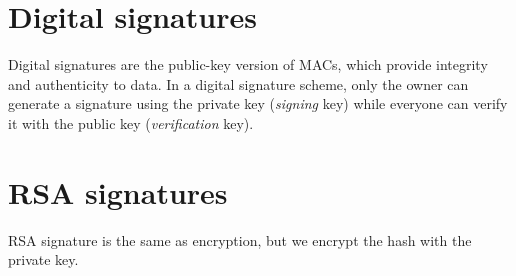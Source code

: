 \section{Digital signatures}
Digital signatures are the public-key version of MACs, which provide integrity and authenticity to data. In a digital signature scheme, only the owner can generate a signature using the private key (\emph{signing} key) while everyone can verify it with the public key (\emph{verification} key).

\section{RSA signatures}
RSA signature is the same as encryption, but we encrypt the hash with the private key.